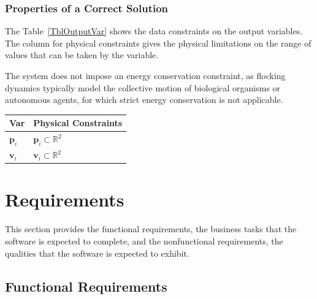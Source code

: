 \documentclass[12pt]{article}
\begin{document}
\subsubsection{Properties of a Correct Solution} \label{sec_CorrectSolution}

The Table~\ref{TblOutputVar} shows the data constraints on the output variables. 
The column for physical constraints gives the physical limitations on the range 
of values that can be taken by the variable.

The system does not impose an energy conservation constraint, as flocking 
dynamics typically model the collective motion of biological organisms or 
autonomous agents, for which strict energy conservation is not applicable.

\begin{table}[!h]
\caption{Output Variables} \label{TblOutputVar}
\renewcommand{\arraystretch}{1.2}
\noindent \begin{longtable*}{l l} 
  \toprule
  \textbf{Var} & \textbf{Physical Constraints} \\
  \midrule 
  $\mathbf{p}_i$ & $\mathbf{p}_i \subset \mathbb{R}^2$ \\
  $\mathbf{v}_i$ & $\mathbf{v}_i \subset \mathbb{R}^2$ \\
  \bottomrule
\end{longtable*}
\end{table}

\section{Requirements}

This section provides the functional requirements, the business tasks that the
software is expected to complete, and the nonfunctional requirements, the
qualities that the software is expected to exhibit.

\subsection{Functional Requirements}
\end{document}
